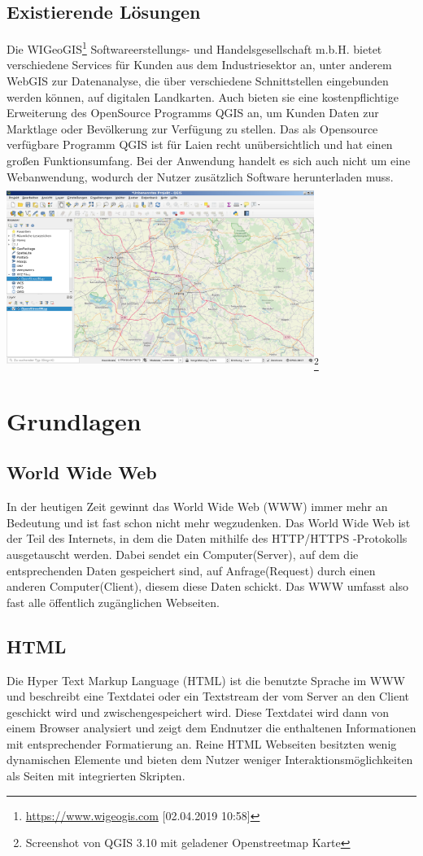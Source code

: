 \documentclass[a4paper, twoside, 12pt]{scrreprt}
\begin{document}
\section{Existierende Lösungen}
Die WIGeoGIS\footnote{\url{https://www.wigeogis.com} [02.04.2019 10:58]} Softwareerstellungs- und Handelsgesellschaft m.b.H. bietet verschiedene Services für Kunden aus dem Industriesektor an, unter anderem WebGIS zur Datenanalyse, die über verschiedene Schnittstellen eingebunden werden können, auf digitalen Landkarten. 
Auch bieten sie eine kostenpflichtige Erweiterung des OpenSource Programms QGIS an, um Kunden Daten zur Marktlage oder Bevölkerung zur Verfügung zu stellen.
Das als Opensource verfügbare Programm QGIS ist für Laien recht unübersichtlich und hat einen großen Funktionsumfang.
Bei der Anwendung handelt es sich auch nicht um eine Webanwendung, wodurch der Nutzer zusätzlich Software herunterladen muss.\\
\includegraphics[height=6cm, width=10cm]{qgis_oberflaeche.png}\footnote{Screenshot von QGIS 3.10 mit geladener Openstreetmap Karte}
\chapter{Grundlagen}
\section{World Wide Web}
In der heutigen Zeit gewinnt das World Wide Web (WWW) immer mehr an Bedeutung und ist fast schon nicht mehr wegzudenken.
Das World Wide Web ist der Teil des Internets, in dem die Daten mithilfe des HTTP/HTTPS -Protokolls ausgetauscht werden. Dabei sendet ein Computer(Server), auf dem die entsprechenden Daten gespeichert sind, auf Anfrage(Request) durch einen anderen Computer(Client), diesem diese Daten schickt.
Das WWW umfasst also fast alle öffentlich zugänglichen Webseiten.
\section{HTML}
Die Hyper Text Markup Language (HTML) ist die benutzte Sprache im WWW und beschreibt eine Textdatei oder ein Textstream der vom Server an den Client geschickt wird und zwischengespeichert wird.
Diese Textdatei wird dann von einem Browser analysiert und zeigt dem Endnutzer die enthaltenen Informationen mit entsprechender Formatierung an.
Reine HTML Webseiten besitzten wenig dynamischen Elemente und bieten dem Nutzer weniger Interaktionsmöglichkeiten als Seiten mit integrierten Skripten.
\end{document}
